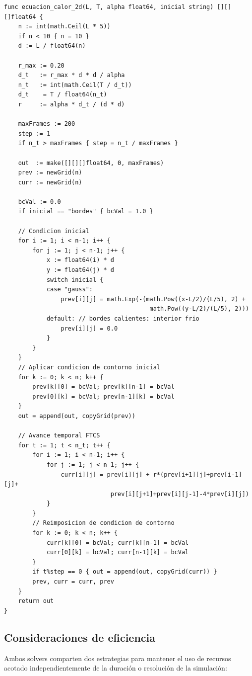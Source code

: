 \documentclass[12pt, a4paper]{article}
\begin{document}
\begin{lstlisting}[style=golang, caption={Solver de la ecuación de calor 2D — \texttt{solver.go}}, label=lst:calor2d]
func ecuacion_calor_2d(L, T, alpha float64, inicial string) [][][]float64 {
    n := int(math.Ceil(L * 5))
    if n < 10 { n = 10 }
    d := L / float64(n)

    r_max := 0.20
    d_t   := r_max * d * d / alpha
    n_t   := int(math.Ceil(T / d_t))
    d_t    = T / float64(n_t)
    r     := alpha * d_t / (d * d)

    maxFrames := 200
    step := 1
    if n_t > maxFrames { step = n_t / maxFrames }

    out  := make([][][]float64, 0, maxFrames)
    prev := newGrid(n)
    curr := newGrid(n)

    bcVal := 0.0
    if inicial == "bordes" { bcVal = 1.0 }

    // Condicion inicial
    for i := 1; i < n-1; i++ {
        for j := 1; j < n-1; j++ {
            x := float64(i) * d
            y := float64(j) * d
            switch inicial {
            case "gauss":
                prev[i][j] = math.Exp(-(math.Pow((x-L/2)/(L/5), 2) +
                                         math.Pow((y-L/2)/(L/5), 2)))
            default: // bordes calientes: interior frio
                prev[i][j] = 0.0
            }
        }
    }
    // Aplicar condicion de contorno inicial
    for k := 0; k < n; k++ {
        prev[k][0] = bcVal; prev[k][n-1] = bcVal
        prev[0][k] = bcVal; prev[n-1][k] = bcVal
    }
    out = append(out, copyGrid(prev))

    // Avance temporal FTCS
    for t := 1; t < n_t; t++ {
        for i := 1; i < n-1; i++ {
            for j := 1; j < n-1; j++ {
                curr[i][j] = prev[i][j] + r*(prev[i+1][j]+prev[i-1][j]+
                              prev[i][j+1]+prev[i][j-1]-4*prev[i][j])
            }
        }
        // Reimposicion de condicion de contorno
        for k := 0; k < n; k++ {
            curr[k][0] = bcVal; curr[k][n-1] = bcVal
            curr[0][k] = bcVal; curr[n-1][k] = bcVal
        }
        if t%step == 0 { out = append(out, copyGrid(curr)) }
        prev, curr = curr, prev
    }
    return out
}
\end{lstlisting}

\subsection{Consideraciones de eficiencia}

Ambos solvers comparten dos estrategias para mantener el uso de recursos acotado
independientemente de la duración o resolución de la simulación:
\end{document}
